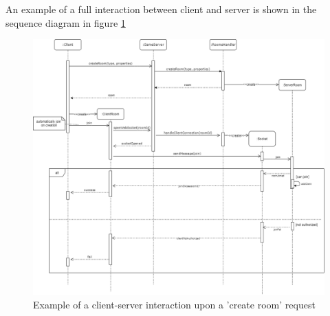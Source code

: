 An example of a full interaction between client and server is shown in the sequence diagram in figure \ref{fig:create_room_seq}
\begin{figure}
	\hspace*{-1in}
	\includegraphics[scale=0.5]{images/4-design/create_room_seq.png}
	\caption{Example of a client-server interaction upon a 'create room' request}
	\label{fig:create_room_seq}
\end{figure}